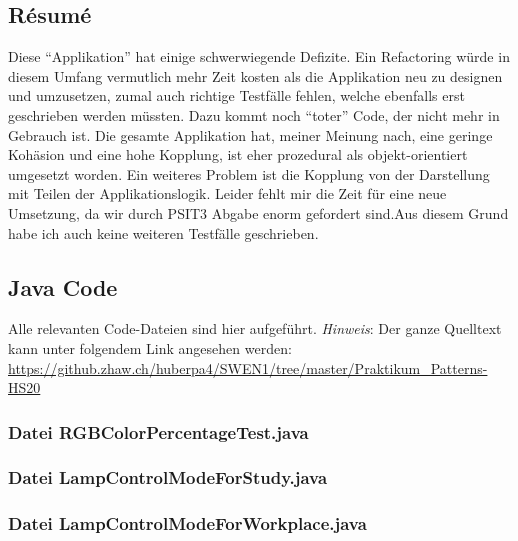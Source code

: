 \documentclass[11pt,ngerman]{article}
\newcommand{\quotes}[1]{``#1''}
\begin{document}
    \subsection{Résumé}
    Diese \quotes{Applikation}  hat einige schwerwiegende Defizite. Ein Refactoring würde in diesem Umfang vermutlich mehr Zeit kosten als die Applikation neu zu designen und umzusetzen, zumal auch  richtige Testfälle fehlen, welche ebenfalls erst  geschrieben werden  müssten. Dazu kommt  noch \quotes{toter} Code, der  nicht mehr in Gebrauch ist. Die gesamte Applikation hat, meiner Meinung nach, eine geringe Kohäsion und eine hohe Kopplung, ist eher prozedural als objekt-orientiert umgesetzt worden. Ein weiteres Problem ist die Kopplung von der Darstellung mit Teilen der Applikationslogik. Leider fehlt mir die Zeit für eine neue Umsetzung, da wir durch PSIT3 Abgabe enorm gefordert sind.Aus diesem Grund habe ich auch keine weiteren Testfälle geschrieben.

    \subsection{Java Code}
    \label{ssec:Codeausschnitte}
    Alle relevanten Code-Dateien sind hier aufgeführt. \newline
    \textit{Hinweis}: Der ganze Quelltext kann unter folgendem Link angesehen werden: \\ \url{https://github.zhaw.ch/huberpa4/SWEN1/tree/master/Praktikum_Patterns-HS20}

\subsubsection{Datei RGBColorPercentageTest.java}

\vspace{.5cm}

\subsubsection{Datei LampControlModeForStudy.java}

\vspace{.5cm}

\subsubsection{Datei LampControlModeForWorkplace.java}

\vspace{.5cm}
\end{document}
